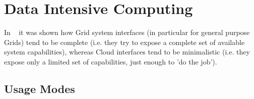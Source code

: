 \documentclass{article}
\newcommand{\amnote}[1]{   {\textcolor{magenta}{ ***Andre:    #1 }}}
\newcommand{\amnote}[1]{}
\newcommand{\up}{\vspace*{-1em}}
\begin{document}
% 

% 


\up
\section{Data Intensive Computing} 

 
In ~\cite{cloud-saga-paper} it was shown how Grid system interfaces
(in particular for general purpose Grids) tend to be complete
(i.e. they try to expose a complete set of available system
capabilities), whereas Cloud interfaces tend to be minimalistic
(i.e. they expose only a limited set of capabilities, just enough to
'do the job').
 
 \up
 \subsection{Usage Modes}
\end{document}
